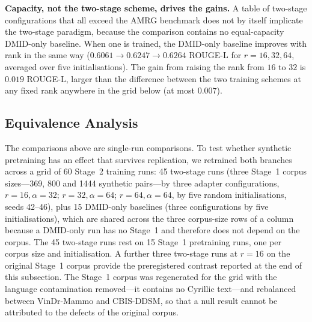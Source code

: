 \documentclass{wlscirep}
\begin{document}
\textbf{Capacity, not the two-stage scheme, drives the gains.} A table of two-stage configurations that all exceed the AMRG benchmark does not by itself implicate the two-stage paradigm, because the comparison contains no equal-capacity DMID-only baseline. When one is trained, the DMID-only baseline improves with rank in the same way ($0.6061 \rightarrow 0.6247 \rightarrow 0.6264$ ROUGE-L for $r=16, 32, 64$, averaged over five initialisations). The gain from raising the rank from $16$ to $32$ is $0.019$ ROUGE-L, larger than the difference between the two training schemes at any fixed rank anywhere in the grid below (at most $0.007$).


\subsection*{Equivalence Analysis}

The comparisons above are single-run comparisons. To test whether synthetic pretraining has an effect that survives replication, we retrained both branches across a grid of 60 Stage~2 training runs: 45 two-stage runs (three Stage~1 corpus sizes---369, 800 and 1444 synthetic pairs---by three adapter configurations, $r=16,\alpha=32$; $r=32,\alpha=64$; $r=64,\alpha=64$, by five random initialisations, seeds 42--46), plus 15 DMID-only baselines (three configurations by five initialisations), which are shared across the three corpus-size rows of a column because a DMID-only run has no Stage~1 and therefore does not depend on the corpus. The 45 two-stage runs rest on 15 Stage~1 pretraining runs, one per corpus size and initialisation. A further three two-stage runs at $r=16$ on the original Stage~1 corpus provide the preregistered contrast reported at the end of this subsection. The Stage~1 corpus was regenerated for the grid with the language contamination removed---it contains no Cyrillic text---and rebalanced between VinDr-Mammo and CBIS-DDSM, so that a null result cannot be attributed to the defects of the original corpus.
\end{document}
